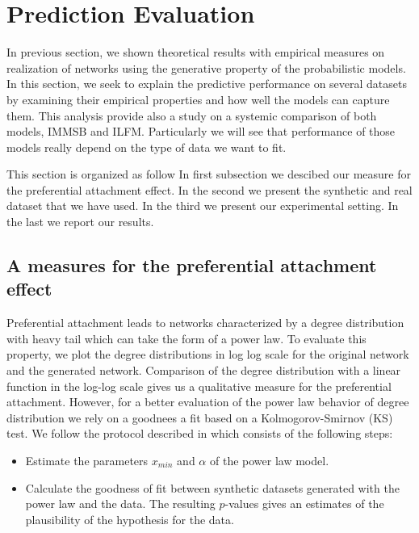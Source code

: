 \section{Prediction Evaluation}
\label{sec:experiments}

In previous section, we shown theoretical results with empirical measures  on realization of networks using the generative property of the probabilistic models. In this section, we seek to explain the predictive performance on several datasets by examining their empirical properties and how well the models can capture them. This analysis provide also a study on a systemic comparison of both models, IMMSB and ILFM. Particularly we will see that performance of those models really depend on the type of data we want to fit.

This section is organized as follow In first subsection we descibed our measure for the preferential attachment effect. In the second we present the synthetic and real dataset that we have used. In the third we present our experimental setting. In the last we report our results.

\subsection{A measures for the preferential attachment effect}

\label{sec:experiments-busrt}
Preferential attachment leads to networks characterized by a degree distribution with heavy tail which can take the form of a power law. To evaluate this property,  we  plot the degree distributions in log log scale for the original network and the generated network. Comparison of the degree distribution with a linear function in the log-log scale  gives us a qualitative measure for the preferential attachment. However, for a better evaluation of the power law behavior of degree distribution we rely on a  goodnees a fit based on a Kolmogorov-Smirnov (KS) test. We follow the protocol described in \cite{clauset2009power} which consists of the following steps:
\begin{itemize}
	\item Estimate the parameters $x_{min}$ and $\alpha$ of the power law model.
	\item Calculate the goodness of fit between synthetic datasets generated with the power law and the data. The resulting $p$-values gives an estimates of the          plausibility of the hypothesis for the data.
\end{itemize}

